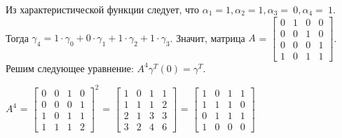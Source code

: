 Из характеристической функции следует, что $\alpha_1 = 1, \alpha_2 = 1, \alpha_3 =~0, \alpha_4 =~1$. Тогда $\gamma_4 = 1 \cdot \gamma_0 + 0 \cdot \gamma_1 + 1 \cdot \gamma_2 + 1 \cdot \gamma_3$. Значит, матрица $A$ = 
$
\begin{bmatrix}
0 &1 &0 &0\\
0 &0 &1 &0 \\
0 &0 &0 &1 \\
1 &0 &1 &1
\end{bmatrix}
$. Решим следующее уравнение: $A^4 \gamma ^T (0) = \gamma ^ T.$

$A^4$ = 
$
\begin{bmatrix}
0 &0 &1 &0\\
0 &0 &0 &1 \\
1 &0 &1 &1 \\
1 &1 &1 &2
\end{bmatrix} ^ 2
$ =
$
\begin{bmatrix}
1 &0 &1 &1\\
1 &1 &1 &2 \\
2 &1 &3 &3 \\
3 &2 &4 &6
\end{bmatrix}
$ =
$
\begin{bmatrix}
1 &0 &1 &1\\
1 &1 &1 &0 \\
0 &1 &1 &1 \\
1 &0 &0 &0
\end{bmatrix}
$

